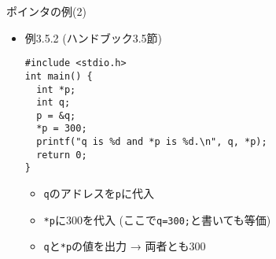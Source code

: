 \begin{frame}[t,fragile]{ポインタの例(2)}
  \begin{itemize}
    \setlength{\itemsep}{1em}
  \item 例3.5.2 (ハンドブック3.5節)
\begin{lstlisting}
#include <stdio.h>
int main() {
  int *p;
  int q;
  p = &q;
  *p = 300;
  printf("q is %d and *p is %d.\n", q, *p);
  return 0;
}
\end{lstlisting}
\begin{itemize}
\item \verb+q+のアドレスを\verb+p+に代入
\item \verb+*p+に300を代入 (ここで\verb+q=300;+と書いても等価)
\item \verb+q+と\verb+*p+の値を出力 → 両者とも300
\end{itemize}
  \end{itemize}
\end{frame}
